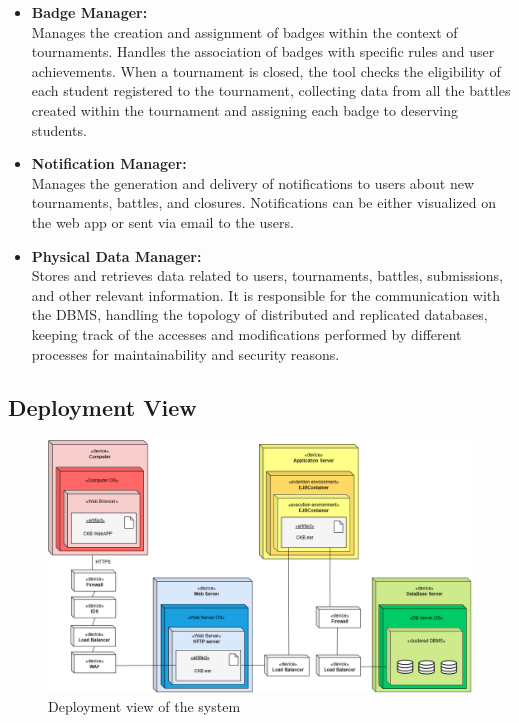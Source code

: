 \begin{itemize}
    \item \textbf{Badge Manager:} \\
    Manages the creation and assignment of badges within the context of tournaments.
    Handles the association of badges with specific rules and user achievements.
    When a tournament is closed, the tool checks the eligibility of each student registered to the tournament, collecting data from all the battles created within the tournament and assigning each badge to deserving students.
    
    \item \textbf{Notification Manager:} \\
    Manages the generation and delivery of notifications to users about new tournaments, battles, and closures. Notifications can be either visualized on the web app or sent via email to the users.
    
    \item \textbf{Physical Data Manager:} \\
    Stores and retrieves data related to users, tournaments, battles, submissions, and other relevant information. It is responsible for the communication with the DBMS, handling the topology of distributed and replicated databases, keeping track of the accesses and modifications performed by different processes for maintainability and security reasons.

\end{itemize}


\subsection {Deployment View}

\begin{figure}[H]
    \centering
    \includegraphics[width=1\linewidth]{Images/DeploymentView.png}
    \caption{Deployment view of the system}
    \label{fig:enter-label}
\end{figure}

